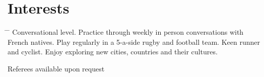 \documentclass[10pt]{article} %
\begin{document}
\vspace{-5mm}
\section{Interests}

\begin{tabbing}
  \hspace{2mm} \= \hspace{18mm} \= \kill 
     {Conversational level. Practice through weekly in person conversations with French natives.}
     {Play regularly in a 5-a-side rugby and football team. Keen runner and cyclist.}
     {Enjoy exploring new cities, countries and their cultures.}
\end{tabbing}

\vspace{-4mm}
Referees available upon request
\end{document}
